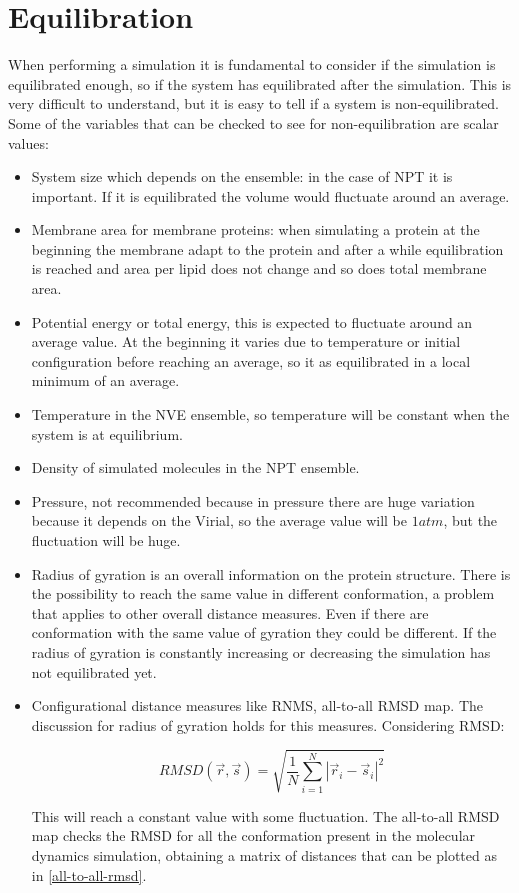 \section{Equilibration}
When performing a simulation it is fundamental to consider if the simulation is equilibrated enough, so if the system has equilibrated after the simulation.
This is very difficult to understand, but it is easy to tell if a system is non-equilibrated.
Some of the variables that can be checked to see for non-equilibration are scalar values:

\begin{multicols}{2}
	\begin{itemize}
		\item System size which depends on the ensemble: in the case of NPT it is important.
			If it is equilibrated the volume would fluctuate around an average.
		\item Membrane area for membrane proteins: when simulating a protein at the beginning the membrane adapt to the protein and after a while equilibration is reached and area per lipid does not change and so does total membrane area.
		\item Potential energy or total energy, this is expected to fluctuate around an average value.
			At the beginning it varies due to temperature or initial configuration before reaching an average, so it as equilibrated in a local minimum of an average.
		\item Temperature in the NVE ensemble, so temperature will be constant when the system is at equilibrium.
		\item Density of simulated molecules in the NPT ensemble.
		\item Pressure, not recommended because in pressure there are huge variation because it depends on the Virial, so the average value will be $1 atm$, but the fluctuation will be huge.
		\item Radius of gyration is an overall information on the protein structure.
			There is the possibility to reach the same value in different conformation, a problem that applies to other overall distance measures.
			Even if there are conformation with the same value of gyration they could be different.
			If the radius of gyration is constantly increasing or decreasing the simulation has not equilibrated yet.
		\item Configurational distance measures like RNMS, all-to-all RMSD map.
			The discussion for radius of gyration holds for this measures.
			Considering RMSD:

			$$RMSD(\vec{r}, \vec{s}) = \sqrt{\frac{1}{N}\sum\limits_{i=1}^N|\vec{r}_i-\vec{s}_i|^2}$$

			This will reach a constant value with some fluctuation.
			The all-to-all RMSD map checks the RMSD for all the conformation present in the molecular dynamics simulation, obtaining a matrix of distances that can be plotted as in \ref{all-to-all-rmsd}.
	\end{itemize}
\end{multicols}

